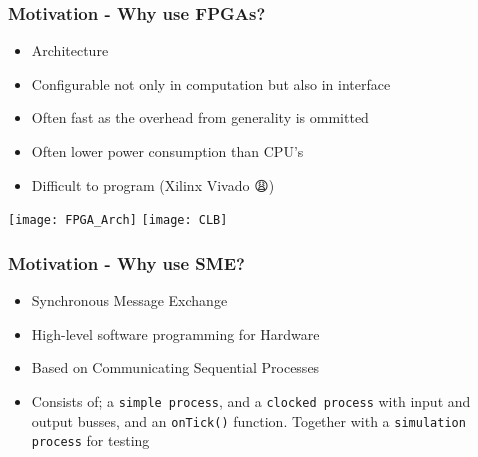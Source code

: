 
\begin{frame}
  \frametitle{Motivation - Why use FPGAs?}
  \begin{minipage}[b]{0.45\textwidth}
    \begin{itemize}
    \item Architecture
    \item Configurable not only in computation but also in interface
    \item Often fast as the overhead from generality is ommitted
    \item Often lower power consumption than CPU's
    \item Difficult to program (Xilinx Vivado {\DejaSans 😩})
    \end{itemize}
  \end{minipage}
  \vspace{30px}
  \begin{minipage}[b]{0.50\textwidth}
    \texttt{[image: FPGA\_Arch]}
    \texttt{[image: CLB]}
  \end{minipage}
\end{frame}

\begin{frame}
  \frametitle{Motivation - Why use SME?}
  \begin{itemize}
  \item Synchronous Message Exchange
  \item High-level software programming for Hardware
  \item Based on Communicating Sequential Processes
  \item Consists of; a \verb~simple process~, and a \verb~clocked process~ with input and output busses, and an \verb~onTick()~ function. Together with a \verb~simulation process~ for testing
  \end{itemize}
\end{frame}
